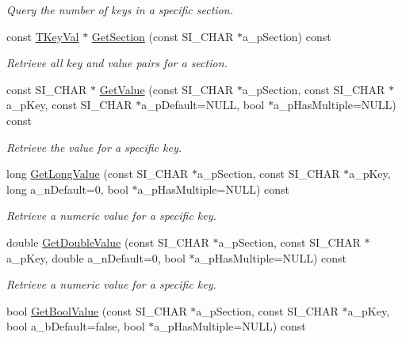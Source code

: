 \begin{DoxyCompactItemize}
\begin{DoxyCompactList}\small\item\em Query the number of keys in a specific section. \end{DoxyCompactList}\item 
const \hyperlink{class_c_simple_ini_templ_ae7f0e11d84617214bd479de6332c80e6}{T\+Key\+Val} $\ast$ \hyperlink{class_c_simple_ini_templ_a795e2fcbad3472055aedfe188f4f8d33}{Get\+Section} (const S\+I\+\_\+\+C\+H\+AR $\ast$a\+\_\+p\+Section) const 
\begin{DoxyCompactList}\small\item\em Retrieve all key and value pairs for a section. \end{DoxyCompactList}\item 
const S\+I\+\_\+\+C\+H\+AR $\ast$ \hyperlink{class_c_simple_ini_templ_a39999339113e9395d5e2c6b02ef5c618}{Get\+Value} (const S\+I\+\_\+\+C\+H\+AR $\ast$a\+\_\+p\+Section, const S\+I\+\_\+\+C\+H\+AR $\ast$a\+\_\+p\+Key, const S\+I\+\_\+\+C\+H\+AR $\ast$a\+\_\+p\+Default=N\+U\+LL, bool $\ast$a\+\_\+p\+Has\+Multiple=N\+U\+LL) const 
\begin{DoxyCompactList}\small\item\em Retrieve the value for a specific key. \end{DoxyCompactList}\item 
long \hyperlink{class_c_simple_ini_templ_a994c6b29bb8b4c16a4b1a7f4c8b2b3f4}{Get\+Long\+Value} (const S\+I\+\_\+\+C\+H\+AR $\ast$a\+\_\+p\+Section, const S\+I\+\_\+\+C\+H\+AR $\ast$a\+\_\+p\+Key, long a\+\_\+n\+Default=0, bool $\ast$a\+\_\+p\+Has\+Multiple=N\+U\+LL) const 
\begin{DoxyCompactList}\small\item\em Retrieve a numeric value for a specific key. \end{DoxyCompactList}\item 
double \hyperlink{class_c_simple_ini_templ_a6ce7c77a1d5d64dc289927a5c2659e78}{Get\+Double\+Value} (const S\+I\+\_\+\+C\+H\+AR $\ast$a\+\_\+p\+Section, const S\+I\+\_\+\+C\+H\+AR $\ast$a\+\_\+p\+Key, double a\+\_\+n\+Default=0, bool $\ast$a\+\_\+p\+Has\+Multiple=N\+U\+LL) const 
\begin{DoxyCompactList}\small\item\em Retrieve a numeric value for a specific key. \end{DoxyCompactList}\item 
bool \hyperlink{class_c_simple_ini_templ_af0a8cffb0b7f6ca04e3eed9ab4660666}{Get\+Bool\+Value} (const S\+I\+\_\+\+C\+H\+AR $\ast$a\+\_\+p\+Section, const S\+I\+\_\+\+C\+H\+AR $\ast$a\+\_\+p\+Key, bool a\+\_\+b\+Default=false, bool $\ast$a\+\_\+p\+Has\+Multiple=N\+U\+LL) const 

\end{DoxyCompactItemize}

